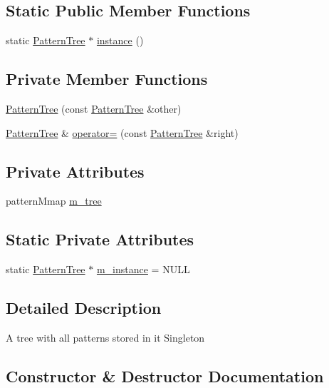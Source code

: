 \subsection*{Static Public Member Functions}
\begin{DoxyCompactItemize}
\item 
static \hyperlink{class_pattern_tree}{PatternTree} $\ast$ \hyperlink{class_pattern_tree_ae3cb1d962789f1bfe37994eec207d493}{instance} ()
\end{DoxyCompactItemize}
\subsection*{Private Member Functions}
\begin{DoxyCompactItemize}
\item 
\hyperlink{class_pattern_tree_af84e0bf107c0fda11f1c971bfe3d9c4f}{PatternTree} (const \hyperlink{class_pattern_tree}{PatternTree} \&other)
\item 
\hyperlink{class_pattern_tree}{PatternTree} \& \hyperlink{class_pattern_tree_ad1ece378133ff4abb282cea9204b0ccc}{operator=} (const \hyperlink{class_pattern_tree}{PatternTree} \&right)
\end{DoxyCompactItemize}
\subsection*{Private Attributes}
\begin{DoxyCompactItemize}
\item 
patternMmap \hyperlink{class_pattern_tree_a8aa612fc369e9106116ad8e3e5b02021}{m\_tree}
\end{DoxyCompactItemize}
\subsection*{Static Private Attributes}
\begin{DoxyCompactItemize}
\item 
static \hyperlink{class_pattern_tree}{PatternTree} $\ast$ \hyperlink{class_pattern_tree_a84a86ffd132359390369421d1fb4c594}{m\_instance} = NULL
\end{DoxyCompactItemize}


\subsection{Detailed Description}
A tree with all patterns stored in it Singleton 

\subsection{Constructor \& Destructor Documentation}
